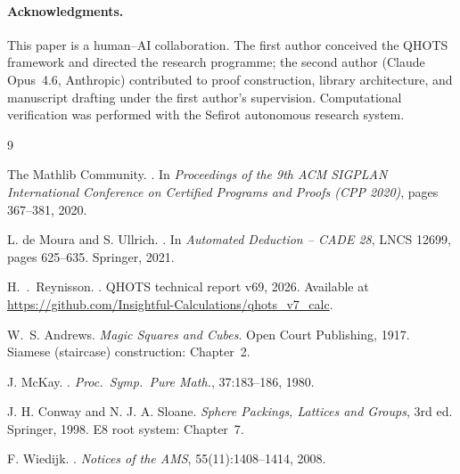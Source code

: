 \documentclass[11pt,a4paper]{article}
\begin{document}
\paragraph{Acknowledgments.}
This paper is a human--AI collaboration.  The first author conceived
the QHOTS framework and directed the research programme; the second
author (Claude Opus~4.6, Anthropic) contributed to proof construction,
library architecture, and manuscript drafting under the first author's
supervision.  Computational verification was performed with the Sefirot
autonomous research system.

\begin{thebibliography}{9}

The Mathlib Community.
.
\newblock In \emph{Proceedings of the 9th ACM SIGPLAN International Conference
  on Certified Programs and Proofs (CPP 2020)}, pages 367--381, 2020.

L. de Moura and S. Ullrich.
.
\newblock In \emph{Automated Deduction -- CADE 28}, LNCS 12699, pages 625--635.
  Springer, 2021.

H.~{\TH}.~Reynisson.
.
\newblock QHOTS technical report v69, 2026.
\newblock Available at \url{https://github.com/Insightful-Calculations/qhots_v7_calc}.

W.~S. Andrews.
\newblock \emph{Magic Squares and Cubes}.
\newblock Open Court Publishing, 1917.
\newblock Siamese (staircase) construction: Chapter~2.

J. McKay.
.
\newblock \emph{Proc.\ Symp.\ Pure Math.}, 37:183--186, 1980.

J. H. Conway and N. J. A. Sloane.
\newblock \emph{Sphere Packings, Lattices and Groups}, 3rd ed.
\newblock Springer, 1998.
\newblock E8 root system: Chapter~7.

F. Wiedijk.
.
\newblock \emph{Notices of the AMS}, 55(11):1408--1414, 2008.

\end{thebibliography}
\end{document}
